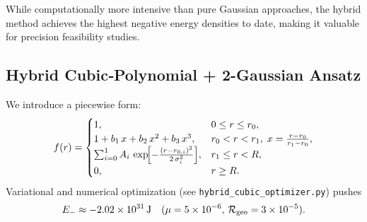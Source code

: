 \documentclass[12pt]{article}
\begin{document}
While computationally more intensive than pure Gaussian approaches, the hybrid method achieves the highest negative energy densities to date, making it valuable for precision feasibility studies.

\subsection{Hybrid Cubic‐Polynomial + 2-Gaussian Ansatz}

We introduce a piecewise form:
\[
  f(r) =
  \begin{cases}
    1, & 0 \le r \le r_0,\\
    1 + b_1\,x + b_2\,x^2 + b_3\,x^3, & r_0 < r < r_1,\; x=\tfrac{r-r_0}{r_1-r_0},\\
    \sum_{i=0}^{1} A_i\,\exp\!\Bigl[-\tfrac{(r - r_{0,i})^2}{2\,\sigma_i^2}\Bigr], & r_1 \le r < R,\\
    0, & r \ge R.
  \end{cases}
\]
Variational and numerical optimization (see \texttt{hybrid_cubic_optimizer.py}) pushes
\[
  E_- \approx -2.02\times10^{31}\,\text{J}
  \quad(\mu=5\times10^{-6},\,\mathcal{R}_{\rm geo}=3\times10^{-5}).
\]
\end{document}
